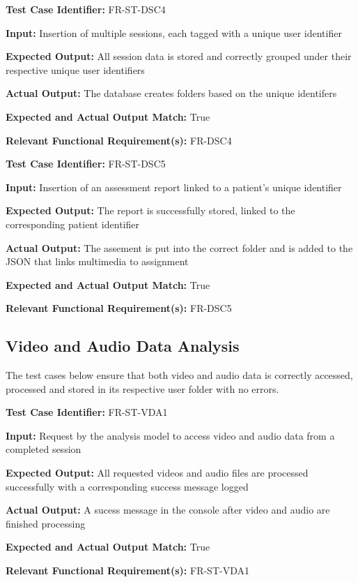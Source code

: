 \documentclass[12pt, titlepage]{article}
\begin{document}
\begin{mdframed}[linewidth=0.5mm] \par
  \textbf{Test Case Identifier:} FR-ST-DSC4 \par
  \textbf{Input:} Insertion of multiple sessions, each tagged with a unique user identifier \par
  \textbf{Expected Output:} All session data is stored and correctly grouped under their respective unique user identifiers \par
  \textbf{Actual Output:} The database creates folders based on the unique identifers \par
  \textbf{Expected and Actual Output Match:} True \par
  \textbf{Relevant Functional Requirement(s):} FR-DSC4
\end{mdframed}

\begin{mdframed}[linewidth=0.5mm] \par
  \textbf{Test Case Identifier:} FR-ST-DSC5 \par
  \textbf{Input:} Insertion of an assessment report linked to a patient's unique identifier \par
  \textbf{Expected Output:} The report is successfully stored, linked to the corresponding patient identifier\par
  \textbf{Actual Output:} The assement is put into the correct folder and is added to the JSON that links multimedia to assignment \par
  \textbf{Expected and Actual Output Match:} True \par
  \textbf{Relevant Functional Requirement(s):} FR-DSC5
\end{mdframed}


\subsection{Video and Audio Data Analysis}
\hspace{2em}The test cases below ensure that both video and audio data is correctly accessed, processed and stored 
in its respective user folder with no errors.

\begin{mdframed}[linewidth=0.5mm] \par
  \textbf{Test Case Identifier:} FR-ST-VDA1 \par
  \textbf{Input:} Request by the analysis model to access video and audio data from a completed session \par
  \textbf{Expected Output:} All requested videos and audio files are processed successfully with a corresponding success message logged \par
  \textbf{Actual Output:} A sucess message in the console after video and audio are finished processing \par
  \textbf{Expected and Actual Output Match:} True \par
  \textbf{Relevant Functional Requirement(s):} FR-ST-VDA1
\end{mdframed}
\end{document}
